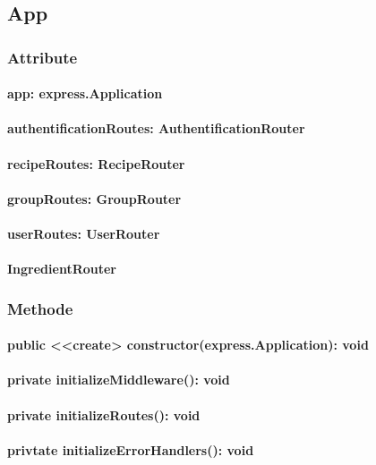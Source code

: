 \documentclass[parskip=full]{scrartcl}
\begin{document}
\subsection{App}
\subsubsection*{Attribute}
\paragraph{app: express.Application}
\paragraph{authentificationRoutes: AuthentificationRouter}
\paragraph{recipeRoutes: RecipeRouter}
\paragraph{groupRoutes: GroupRouter}
\paragraph{userRoutes: UserRouter}
\paragraph{IngredientRouter}

\subsubsection*{Methode}
\paragraph{public <<create> constructor(express.Application): void}
\paragraph{private initializeMiddleware(): void}
\paragraph{private initializeRoutes(): void}
\paragraph{privtate initializeErrorHandlers(): void}
\end{document}
